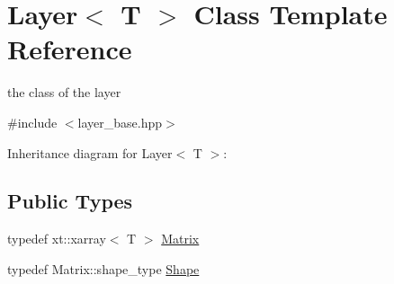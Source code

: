 \hypertarget{class_layer}{}\section{Layer$<$ T $>$ Class Template Reference}
\label{class_layer}


the class of the layer  




{\ttfamily \#include $<$layer\+\_\+base.\+hpp$>$}



Inheritance diagram for Layer$<$ T $>$\+:
\subsection*{Public Types}
\begin{DoxyCompactItemize}
\item 
typedef xt\+::xarray$<$ T $>$ \mbox{\hyperlink{class_layer_a22b1e7286096aa62bd245536c8ebdaf1}{Matrix}}
\item 
typedef Matrix\+::shape\+\_\+type \mbox{\hyperlink{class_layer_a8313f42d2292d12dd5d40cc115636693}{Shape}}
\end{DoxyCompactItemize}
